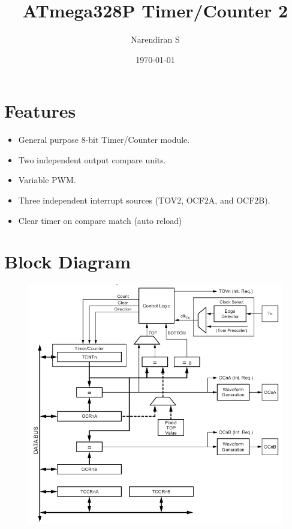 \documentclass{article}
\title{ATmega328P Timer/Counter 2}
\author{Narendiran S}
\date{\today}
\begin{document}
\maketitle

\section{Features}
\begin{itemize}
    \item General purpose 8-bit Timer/Counter module.
    \item Two independent output compare units.
    \item Variable PWM.
    \item Three independent interrupt sources (TOV2, OCF2A, and OCF2B).
    \item Clear timer on compare match (auto reload)
\end{itemize}

\section{Block Diagram}
\begin{figure}[H]
    \begin{center}
        \includegraphics[height=0.6\textheight]{Timer0BlockDiagram.png}
    \end{center}
\end{figure}
\end{document}
